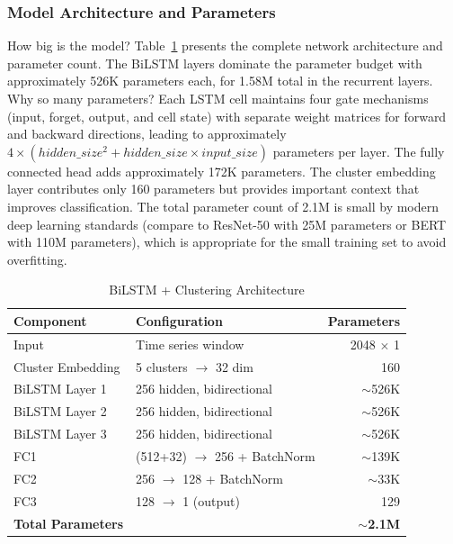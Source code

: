\documentclass[letterpaper]{article} %
\begin{document}
\subsubsection{Model Architecture and Parameters}
How big is the model? Table~\ref{tab:bilstm_architecture} presents the complete network architecture and parameter count. The BiLSTM layers dominate the parameter budget with approximately 526K parameters each, for 1.58M total in the recurrent layers. Why so many parameters? Each LSTM cell maintains four gate mechanisms (input, forget, output, and cell state) with separate weight matrices for forward and backward directions, leading to approximately $4 \times (hidden\_size^2 + hidden\_size \times input\_size)$ parameters per layer. The fully connected head adds approximately 172K parameters. The cluster embedding layer contributes only 160 parameters but provides important context that improves classification. The total parameter count of 2.1M is small by modern deep learning standards (compare to ResNet-50 with 25M parameters or BERT with 110M parameters), which is appropriate for the small training set to avoid overfitting.

\begin{table}[h]
\centering
\caption{BiLSTM + Clustering Architecture}
\label{tab:bilstm_architecture}
\begin{tabular}{@{}lp{3cm}r@{}}
\toprule
\textbf{Component} & \textbf{Configuration} & \textbf{Parameters} \\
\midrule
Input & Time series window & 2048 $\times$ 1 \\
Cluster Embedding & 5 clusters $\rightarrow$ 32 dim & 160 \\
BiLSTM Layer 1 & 256 hidden, bidirectional & $\sim$526K \\
BiLSTM Layer 2 & 256 hidden, bidirectional & $\sim$526K \\
BiLSTM Layer 3 & 256 hidden, bidirectional & $\sim$526K \\
FC1 & (512+32) $\rightarrow$ 256 + BatchNorm & $\sim$139K \\
FC2 & 256 $\rightarrow$ 128 + BatchNorm & $\sim$33K \\
FC3 & 128 $\rightarrow$ 1 (output) & 129 \\
\midrule
\textbf{Total Parameters} & & \textbf{$\sim$2.1M} \\
\bottomrule
\end{tabular}
\end{table}
\end{document}
